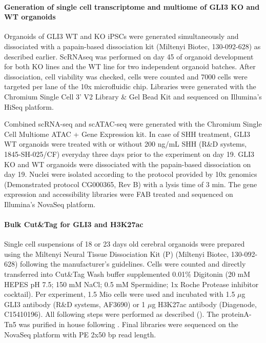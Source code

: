 \paragraph{Generation of single cell transcriptome and multiome of GLI3 KO and WT organoids}
Organoids of GLI3 WT and KO iPSCs were generated simultaneously and dissociated with a papain-based dissociation kit (Miltenyi Biotec, 130-092-628) as described earlier. ScRNAseq was performed on day 45 of organoid development for both KO lines and the WT line for two independent organoid batches. After dissociation, cell viability was checked, cells were counted and 7000 cells were targeted per lane of the 10x microfluidic chip. Libraries were generated with the Chromium Single Cell 3' V2 Library \& Gel Bead Kit and sequenced on Illumina's HiSeq platform.

Combined scRNA-seq and scATAC-seq were generated with the Chromium Single Cell Multiome ATAC + Gene Expression kit. In case of SHH treatment, GLI3 WT organoids were treated with or without 200 ng/mL SHH (R\&D systems, 1845-SH-025/CF) everyday three days prior to the experiment on day 19. GLI3 KO and WT organoids were dissociated with the papain-based dissociation on day 19. Nuclei were isolated according to the protocol provided by 10x genomics (Demonstrated protocol CG000365, Rev B) with a lysis time of 3 min. The gene expression and accessibility libraries were FAB treated and sequenced on Illumina's NovaSeq platform.
 
\paragraph{Bulk Cut\&Tag for GLI3 and H3K27ac}
Single cell suspensions of 18 or 23 days old cerebral organoids were prepared using the Miltenyi Neural Tissue Dissociation Kit (P) (Miltenyi Biotec, 130-092-628) following the manufacturer's guidelines. Cells were counted and directly transferred into Cut\&Tag Wash buffer supplemented 0.01\% Digitonin (20 mM HEPES pH 7.5; 150 mM NaCl; 0.5 mM Spermidine; 1x Roche Protease inhibitor cocktail). Per experiment, 1.5 Mio cells were used and incubated with 1.5 $\mu$g GLI3 antibody (R\&D systems, AF3690) or 1 $\mu$g H3K27ac antibody (Diagenode, C15410196). All following steps were performed as described (\cite{kaya-okur_cuttag_2019}). The proteinA-Tn5 was purified in house following \cite{kaya-okur_cuttag_2019}. Final libraries were sequenced on the NovaSeq platform with PE 2x50 bp read length.
 

